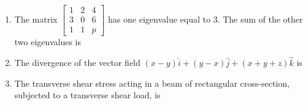 \documentclass[journal,12pt,onecolumn]{IEEEtran}
\begin{document}
\begin{enumerate}
          \begin{enumerate}
          \end{enumerate}

    \item The matrix $\begin{bmatrix}
                  1 & 2 & 4 \\
                  3 & 0 & 6 \\
                  1 & 1 & p
              \end{bmatrix}$ has one eigenvalue equal to 3. The sum of the other two eigenvalues is\\

          \begin{enumerate}
          \end{enumerate}

    \item The divergence of the vector field $(x-y)\hat{i} + (y-x)\hat{j} + (x+y+z)\hat{k}$ is\\

          \begin{enumerate}
          \end{enumerate}

    \item The transverse shear stress acting in a beam of rectangular cross-section, subjected to a transverse shear load, is\\


\end{enumerate}
\end{document}
